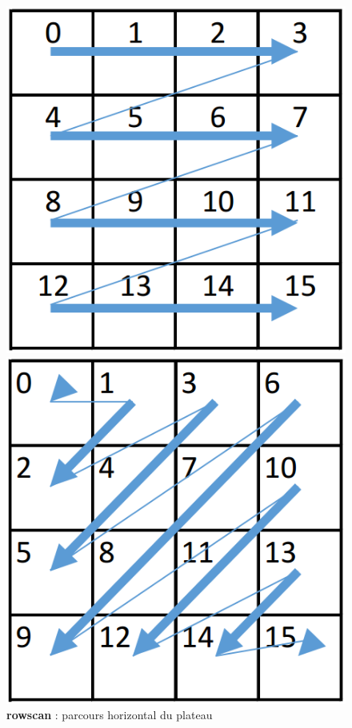 	\begin{figure}[H]
		\includegraphics[width=\linewidth]{images/parcours_rowscan.png}
		\caption{\textbf{rowscan} : parcours horizontal du plateau}\label{fig:parcours_rowscan}
		\endminipage\hfill
		\includegraphics[width=\linewidth]{images/parcours_diagonal.png}

\end{figure}
